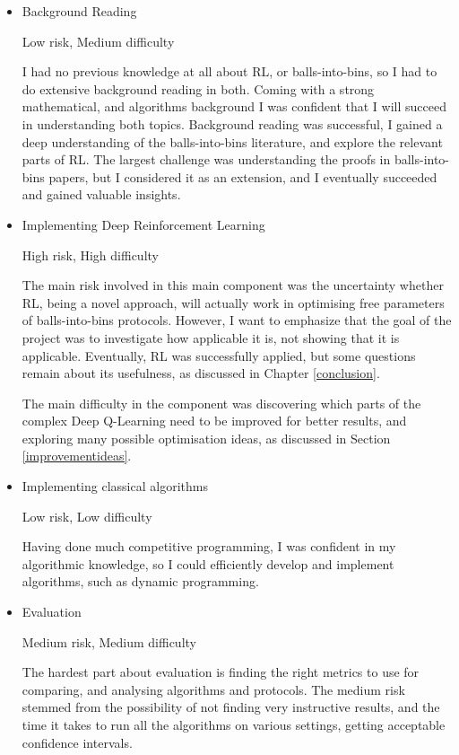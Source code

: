 \begin{itemize}
    \item Background Reading
    
    Low risk, Medium difficulty 
    
    I had no previous knowledge at all about RL, or balls-into-bins, so I had to do extensive background reading in both. Coming with a strong mathematical, and algorithms background I was confident that I will succeed in understanding both topics. Background reading was successful, I gained a deep understanding of the balls-into-bins literature, and explore the relevant parts of RL. The largest challenge was understanding the proofs in balls-into-bins papers, but I considered it as an extension, and I eventually succeeded and gained valuable insights.
    \item Implementing Deep Reinforcement Learning
    
    High risk, High difficulty
    
    The main risk involved in this main component was the uncertainty whether RL, being a novel approach, will actually work in optimising free parameters of balls-into-bins protocols. However, I want to emphasize that the goal of the project was to investigate how applicable it is, not showing that it is applicable. Eventually, RL was successfully applied, but some questions remain about its usefulness, as discussed in Chapter \ref{conclusion}.
    
    
    The main difficulty in the component was discovering which parts of the complex Deep Q-Learning need to be improved for better results, and exploring many possible optimisation ideas, as discussed in Section \ref{improvementideas}.
    
    \item Implementing classical algorithms
    
    Low risk, Low difficulty
    
    Having done much competitive programming, I was confident in my algorithmic knowledge, so I could efficiently develop and implement algorithms, such as dynamic programming.
    
    \item Evaluation
    
    Medium risk, Medium difficulty
    
    The hardest part about evaluation is finding the right metrics to use for comparing, and analysing algorithms and protocols. The medium risk stemmed from the possibility of not finding very instructive results, and the time it takes to run all the algorithms on various settings, getting acceptable confidence intervals.
    
    
\end{itemize}